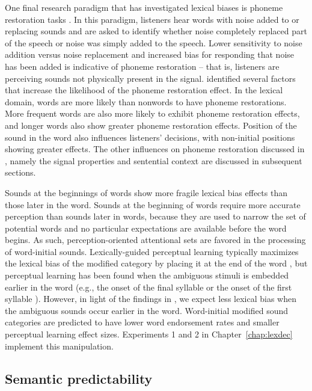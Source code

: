 One final research paradigm that has investigated lexical biases is phoneme restoration tasks \citep{Samuel1981}.  
In this paradigm, listeners hear words with noise added to or replacing sounds and are asked to identify whether noise completely replaced part of the speech or noise was simply added to the speech.  
Lower sensitivity to noise addition versus noise replacement and increased bias for responding that noise has been added is indicative of phoneme restoration -- that is, listeners are perceiving sounds not physically present in the signal.  
\citet{Samuel1981} identified several factors that increase the likelihood of the phoneme restoration effect.
In the lexical domain, words are more likely than nonwords to have phoneme restorations.  
More frequent words are also more likely to exhibit phoneme restoration effects, and longer words also show greater phoneme restoration effects.  
Position of the sound in the word also influences listeners' decisions, with non-initial positions showing greater effects. 
The other influences on phoneme restoration discussed in \citet{Samuel1981}, namely the signal properties and sentential context are discussed in subsequent sections.

Sounds at the beginnings of words show more fragile lexical bias effects than those later in the word.  
Sounds at the beginning of words require more accurate perception than sounds later in words, because they are used to narrow the set of potential words and no particular expectations are available before the word begins.  
As such, perception-oriented attentional sets are favored in the processing of word-initial sounds.  
Lexically-guided perceptual learning typically maximizes the lexical bias of the modified category by placing it at the end of the word \citep{Norris2003}, but perceptual learning has been found when the ambiguous stimuli is embedded earlier in the word (e.g., the onset of the final syllable \citep{Kraljic2005, Kraljic2008, Kraljic2008a} or the onset of the first syllable \citep{Clare2014}).  
However, in light of the findings in \citet{Pitt2012}, we expect less lexical bias when the ambiguous sounds occur earlier in the word.
Word-initial modified sound categories are predicted to have lower word endorsement rates and smaller perceptual learning effect sizes.  
Experiments 1 and 2  in Chapter~\ref{chap:lexdec} implement this manipulation.

\subsection{Semantic predictability}
\label{sec:semanticpredictability}


